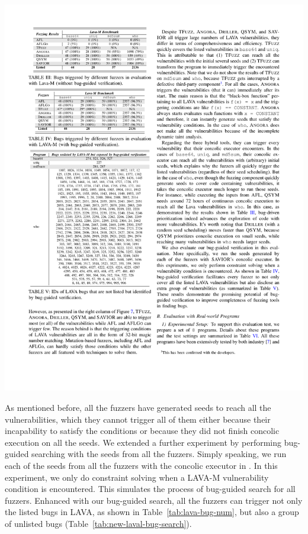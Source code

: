 \begin{table}[h]
\begin{minipage}[b]{0.45\textwidth}
		\includegraphics[scale=0.80]{savior/tables/unlistedlavabug}
	\end{minipage}
\end{table}


As mentioned before, all the fuzzers have generated seeds to reach all the vulnerabilities, which they cannot 
trigger all of them either because their incapability to satisfy the conditions or because they did not finish 
concolic execution on all the seeds. We extended a further experiment by performing bug-guided searching with 
the seeds from all the fuzzers. Simply speaking, we run each of the seeds from all the fuzzers with the 
concolic executor in \savior. In this experiment, we only do constraint solving when a LAVA-M vulnerability condition
is encountered. This simulates the process of bug-guided search for all fuzzers. Enhanced with our bug-guided search, all the fuzzers 
can trigger not only the listed bugs in LAVA, as shown in Table~\ref{tab:lava-bug-num}, 
but also a group of unlisted bugs (Table~\ref{tab:new-laval-bug-search}). 






